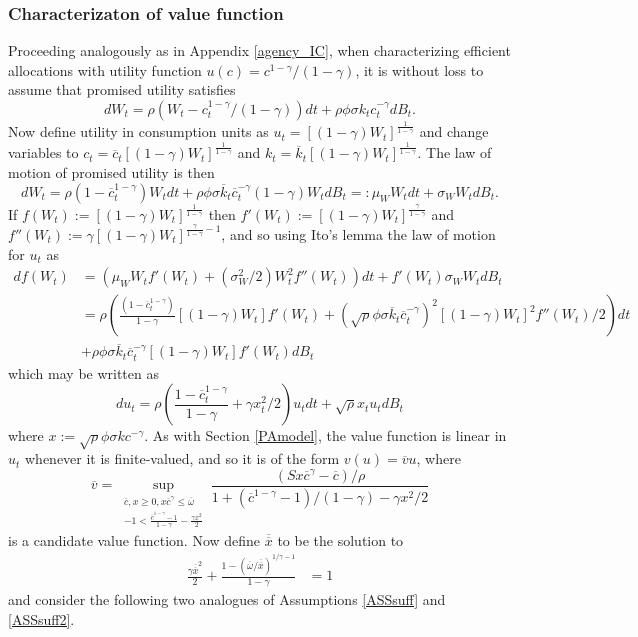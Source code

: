 \documentclass[11pt]{article}
\theoremstyle{plain}
\theoremstyle{definition} %
\begin{document}
\subsubsection{Characterizaton of value function}

Proceeding analogously as in Appendix \ref{agency_IC}, when characterizing efficient allocations with utility function $u(c) = c^{1-\gamma}/(1-\gamma)$, it is without loss to assume that promised utility satisfies
$$
dW_t = \rho{\left(W_t - c_t^{1-\gamma}/(1 - \gamma) \right)}dt + \rho \phi \sigma k_t c_t^{-\gamma} dB_t. 
$$
Now define utility in consumption units as $u_t = [(1-\gamma)W_t]^{\frac{1}{1-\gamma}}$ and change variables to $c_t = \overline{c}_t[(1-\gamma)W_t]^{\frac{1}{1-\gamma}}$ and $k_t = \overline{k}_t[(1-\gamma)W_t]^{\frac{1}{1-\gamma}}$. The law of motion of promised utility is then 
$$
dW_t = \rho{\left(1 - \overline{c}_t^{1-\gamma}\right)}W_t dt + \rho \phi \sigma \overline{k}_t \overline{c}_t^{-\gamma} (1-\gamma)W_t dB_t =: \mu_WW_tdt + \sigma_WW_t dB_t.
$$
If $f(W_t) := [(1-\gamma)W_t]^{\frac{1}{1-\gamma}}$ then $f'(W_t) := [(1-\gamma)W_t]^{\frac{\gamma}{1-\gamma}}$ and $f''(W_t) := \gamma[(1-\gamma)W_t]^{\frac{\gamma}{1-\gamma}-1}$, and so using Ito's lemma the law of motion for $u_t$ as 
\begin{align*}
df(W_t) & = (\mu_WW_t f'(W_t)+ (\sigma_W^2/2)W_t^2f''(W_t))dt + f'(W_t)\sigma_WW_tdB_t
\\ & = \rho {\left( \frac{(1 - \overline{c}_t^{1-\gamma})}{1-\gamma} [(1-\gamma)W_t] f'(W_t) + (\sqrt{\rho} \phi \sigma \overline{k}_t \overline{c}_t^{-\gamma})^2[(1-\gamma)W_t]^2f''(W_t)/2\right)}dt 
\\ & + \rho \phi \sigma \overline{k}_t \overline{c}_t^{-\gamma}[(1-\gamma)W_t] f'(W_t)dB_t
\end{align*}
which may be written as 
$$
du_t = \rho{\left( \frac{1 - \overline{c}_t^{1-\gamma}}{1-\gamma} + \gamma x_t^2/2\right)}u_t dt + \sqrt{\rho} x_t u_t dB_t
$$
where $x := \sqrt{\rho} \phi \sigma k c^{-\gamma}$. As with Section \ref{PAmodel}, the value function is linear in $u_t$ whenever it is finite-valued, and so it is of the form $v(u) = \overline{v}u$, where
\begin{equation}
\overline{v} = \sup_{\substack{\overline{c},x\geq0, x\overline{c}^{\gamma} \leq \overline{\omega} \\ -1 < \frac{\overline{c}^{1-\gamma} - 1}{1-\gamma} - \frac{\gamma x^2}{2}}} \frac{(Sx\overline{c}^{\gamma} - \overline{c})/\rho}{1 + (\overline{c}^{1-\gamma}-1)/(1-\gamma) - \gamma x^2/2}
\label{cand2}
\end{equation} 
is a candidate value function. Now define $\overline{\overline{x}}$ to be the solution to
\begin{align*}
\frac{\gamma \overline{\overline{x}}^2}{2} + \frac{1 - (\overline{\omega}/\overline{\overline{x}})^{1/\gamma-1}}{1-\gamma} & = 1
\end{align*}
and consider the following two analogues of Assumptions \ref{ASSsuff} and \ref{ASSsuff2}. 
\end{document}
